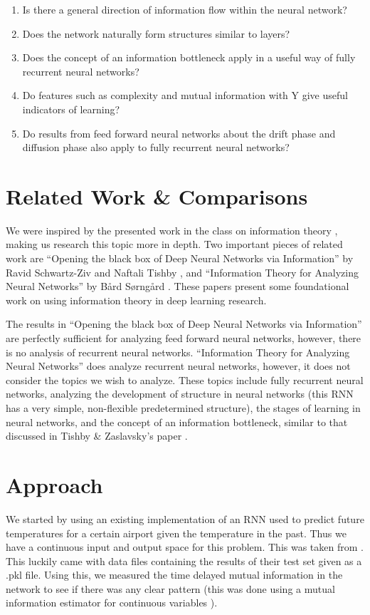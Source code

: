 \begin{enumerate}
	\item Is there a general direction of information flow within the neural network?
	\item Does the network naturally form structures similar to layers?
	\item Does the concept of an information bottleneck apply in a useful way of fully recurrent neural networks?
	\item Do features such as complexity and mutual information with Y give useful indicators of learning?
	\item Do results from feed forward neural networks about the drift phase and diffusion phase also apply to fully recurrent neural networks?
\end{enumerate}

\section{Related Work \& Comparisons}
We were inspired by the presented work in the class on information theory
\cite{disentangling_representations}, making us research this topic more in
depth. Two important pieces of related work are “Opening the black box of Deep
Neural Networks via Information” by Ravid Schwartz-Ziv and Naftali Tishby
\cite{black_box}, and “Information Theory for Analyzing
Neural Networks” by B\aa rd S\o rng\aa rd \cite{ntnu}. These papers present some
foundational work on using information theory in deep learning research.

The results in “Opening the black box of Deep Neural Networks via Information”
are perfectly sufficient for analyzing feed forward neural networks, however,
there is no analysis of recurrent neural networks. “Information Theory for
Analyzing Neural Networks” does analyze recurrent neural networks, however, it
does not consider the topics we wish to analyze. These topics include fully
recurrent neural networks, analyzing the development of structure in neural
networks (this RNN has a very simple, non-flexible predetermined structure), the
stages of learning in neural networks, and the concept of an information
bottleneck, similar to that discussed in Tishby \& Zaslavsky's paper
\cite{info_bottleneck}.

\section{Approach}
We started by using an existing implementation of an RNN used to predict future
temperatures for a certain airport given the temperature in the past. Thus we
have a continuous input and output space for this problem. This was taken from
\cite{weather}. This luckily came with data files containing the results of
their test set given as a .pkl file. Using this, we measured the time delayed
mutual information in the network to see if there was any clear pattern (this
was done using a mutual information estimator for continuous variables
\cite{mutual_info, content_transfer, social_media}).

